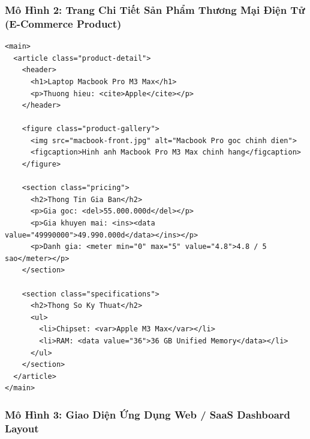 \clearpage
\subsubsection{Mô Hình 2: Trang Chi Tiết Sản Phẩm Thương Mại Điện Tử (E-Commerce Product)}

\begin{codeWindowBreakable}
\begin{lstlisting}[language=HTML5]
<main>
  <article class="product-detail">
    <header>
      <h1>Laptop Macbook Pro M3 Max</h1>
      <p>Thuong hieu: <cite>Apple</cite></p>
    </header>

    <figure class="product-gallery">
      <img src="macbook-front.jpg" alt="Macbook Pro goc chinh dien">
      <figcaption>Hinh anh Macbook Pro M3 Max chinh hang</figcaption>
    </figure>

    <section class="pricing">
      <h2>Thong Tin Gia Ban</h2>
      <p>Gia goc: <del>55.000.000d</del></p>
      <p>Gia khuyen mai: <ins><data value="49990000">49.990.000d</data></ins></p>
      <p>Danh gia: <meter min="0" max="5" value="4.8">4.8 / 5 sao</meter></p>
    </section>

    <section class="specifications">
      <h2>Thong So Ky Thuat</h2>
      <ul>
        <li>Chipset: <var>Apple M3 Max</var></li>
        <li>RAM: <data value="36">36 GB Unified Memory</data></li>
      </ul>
    </section>
  </article>
</main>
\end{lstlisting}
\end{codeWindowBreakable}

\clearpage
\subsubsection{Mô Hình 3: Giao Diện Ứng Dụng Web / SaaS Dashboard Layout}

